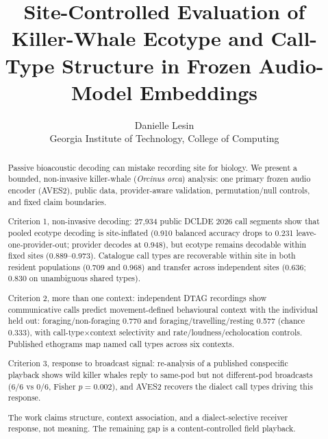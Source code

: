 \documentclass[11pt]{article}
\title{\vspace{-2.5em}Site-Controlled Evaluation of Killer-Whale Ecotype and
Call-Type Structure in Frozen Audio-Model Embeddings}
\author{Danielle Lesin \\ \small Georgia Institute of Technology, College of Computing}
\date{\vspace{-1em}}
\begin{document}
\maketitle
\vspace{-1.5em}

\begin{abstract}
\noindent Passive bioacoustic decoding can mistake recording site for biology. We present
a bounded, non-invasive killer-whale (\emph{Orcinus orca}) analysis: one primary frozen audio
encoder (AVES2), public data, provider-aware validation, permutation/null controls, and
fixed claim boundaries.

Criterion 1, non-invasive decoding: 27{,}934 public DCLDE 2026 call segments show that
pooled ecotype decoding is site-inflated (0.910 balanced accuracy drops to 0.231
leave-one-provider-out; provider decodes at 0.948), but ecotype remains decodable within
fixed sites (0.889--0.973). Catalogue call types are recoverable within site in both
resident populations (0.709 and 0.968) and transfer across independent sites (0.636; 0.830
on unambiguous shared types).

Criterion 2, more than one context: independent DTAG recordings show communicative calls
predict movement-defined behavioural context with the individual held out:
foraging/non-foraging 0.770 and foraging/travelling/resting 0.577 (chance 0.333), with
call-type$\times$context selectivity and rate/loudness/echolocation controls. Published
ethograms map named call types across six contexts.

Criterion 3, response to broadcast signal: re-analysis of a published conspecific
playback shows wild killer whales reply to same-pod but not different-pod broadcasts (6/6
vs 0/6, Fisher $p=0.002$), and AVES2 recovers the dialect call types driving this response.

The work claims structure, context association, and a dialect-selective receiver
response, not meaning. The remaining gap is a content-controlled field playback.
\end{abstract}

\vspace{-0.5em}
\end{document}
